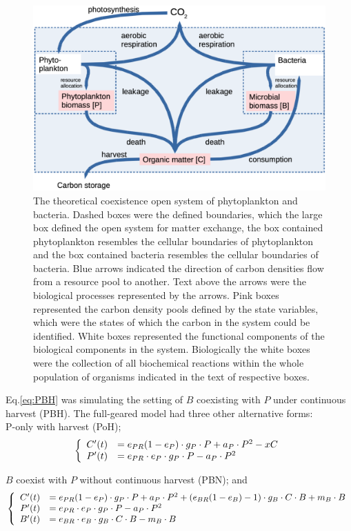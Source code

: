 \documentclass[../thesis.tex]{subfiles} %
\begin{document}
\begin{figure}[H]
    \centering
    \includegraphics[width=.8\linewidth]{media/model.png}
    \caption[Model visualization]{The theoretical coexistence open system of phytoplankton and bacteria.  Dashed boxes were the defined boundaries, which the large box defined the open system for matter exchange, the box contained phytoplankton resembles the cellular boundaries of phytoplankton and the box contained bacteria resembles the cellular boundaries of bacteria.  Blue arrows indicated the direction of carbon densities flow from a resource pool to another.  Text above the arrows were the biological processes represented by the arrows.  Pink boxes represented the carbon density pools defined by the state variables, which were the states of which the carbon in the system could be identified.  White boxes represented the functional components of the biological components in the system.  Biologically the white boxes were the collection of all biochemical reactions within the whole population of organisms indicated in the text of respective boxes.}
    \label{f:model}
\end{figure}

Eq.\ref{eq:PBH} was simulating the setting of $B$ coexisting with $P$ under continuous harvest (PBH).  The full-geared model had three other alternative forms:\\
P-only with harvest (PoH);
\begin{equation}\left\{\begin{array}{rl}
    C'(t) &= e_{PR}(1-e_P)\cdot g_P\cdot P +a_P\cdot P^2 -xC\\
    P'(t) &= e_{PR}\cdot e_P\cdot g_P\cdot P -a_P\cdot P^2
\end{array}\right.\label{eq:PoH}\end{equation}

$B$ coexist with $P$ without continuous harvest (PBN); and
\begin{equation}\left\{\begin{array}{rl}
    C'(t) &= e_{PR}(1-e_P)\cdot g_P\cdot P +a_P\cdot P^2 +(e_{BR}(1-e_B)-1)\cdot g_B\cdot C\cdot B +m_B\cdot B\\
    P'(t) &= e_{PR}\cdot e_P\cdot g_P\cdot P -a_P\cdot P^2\\
    B'(t) &= e_{BR}\cdot e_B\cdot g_B\cdot C\cdot B -m_B\cdot B
\end{array}\right.\label{eq:PBN}\end{equation}
\end{document}
